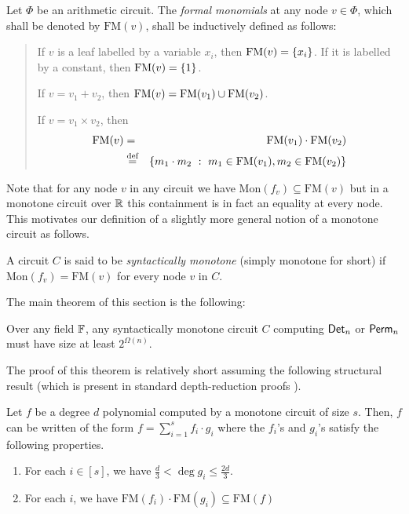 \documentclass{birkjour}
\newcommand{\FM}{\mathrm{FM}}
\newcommand{\Mon}{\mathrm{Mon}}
\begin{document}
	\begin{definition}
  Let $\Phi$ be an arithmetic circuit. The \emph{formal monomials} at
  any node $v\in \Phi$, which shall be denoted by $\FM(v)$, shall 
  be inductively defined as follows:
	  \begin{quote}
	    If $v$ is a leaf labelled by a variable $x_i$, then $\FM(v) =
	    \inbrace{x_i}$. If it is labelled by a constant, then $\FM(v) =
	    \inbrace{1}$.

	    If $v = v_1 + v_2$, then $\FM(v) = \FM(v_1) \union \FM(v_2)$. 

	    If $v = v_1 \times v_2$, then 
            \begin{eqnarray*}
              \FM(v) &=& \FM(v_1)\cdot \FM(v_2)\\
              &\eqdef& \setdef{m_1\cdot m_2}{m_1 \in \FM(v_1), m_2\in \FM(v_2)}
            \end{eqnarray*}
          \end{quote}
	\end{definition}

\noindent Note that for any node $v$ in any circuit 
	we have $\Mon(f_{v}) \subseteq \FM(v)$ but in a 
	monotone circuit over $\mathbb{R}$ this containment is in 
	fact an equality at every node. This motivates our 
	definition of a slightly more general notion of a 
	monotone circuit as follows. 

	
\begin{definition}
  A circuit $C$ is said to be
  \emph{syntactically monotone}
   (simply monotone for short) if $\Mon(f_{v}) = \FM(v)$ 
   for every node $v$ in $C$.
\end{definition}

	
	
The main theorem of this section is the following: 

\begin{theorem}[\cite{js82}]\label{thm:monotone-circuit-lbs}
	Over any field $\mathbb{F}$, any syntactically monotone circuit 
	$C$ computing $\mathsf{Det}_n$ or $\mathsf{Perm}_n$ must have
  size at least $2^{\Omega(n)}$.
\end{theorem}

The proof of this theorem is relatively short assuming the
	following structural result (which is present in standard
	depth-reduction proofs \cite{vsbr83,ajmv98}).

\begin{lemma}\label{lem:vsbr-two-thirds}
  Let $f$ be a degree $d$ polynomial computed by a monotone circuit of
  size $s$. Then, $f$ can be written of the form $f = \sum_{i=1}^s f_i
  \cdot g_i$ where the $f_i$'s and $g_i$'s satisfy the following
  properties.
\begin{enumerate}
\item For each $i\in [s]$, we have $\frac{d}{3} < \deg{g_i} \leq
  \frac{2d}{3}$.
\item For each $i$, we have $\FM(f_i)\cdot \FM(g_i) \subseteq \FM(f)$
\end{enumerate}
\end{lemma}
\end{document}
